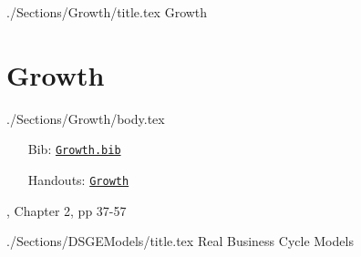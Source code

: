 \documentclass{\econtex}\newcommand{\texname}{Syllabus}
\begin{document}


\begin{verbatimwrite}{./Sections/Growth/title.tex}
Growth
\end{verbatimwrite}

\ifPost
{} 
\fi

\section{Growth}\label{sec:Growth}

\begin{verbatimwrite}{./Sections/Growth/body.tex}

\providecommand{\blf}{\cite{blanchard&fischer:text}}
\providecommand{\ro}{\cite{romer:text}}
\begin{itemize}
\item[Bib:] \texttt{\href{http://www.econ2.jhu.edu/people/ccarroll/courses/Choice/Syllabus/Growth.bib}{Growth.bib}}
\item[Handouts:]  \texttt{\href{http://www.econ2.jhu.edu/people/ccarroll/courses/choice/LectureNotes/Growth/}{Growth}}
\end{itemize}
\bi
\reqd \blf, Chapter 2, pp 37-57
\reqd \cite{deatonStateCapacity}
\reqd \cite{salaimartin:lecnotes}
\recm \cite{king&rebelo:trans}
\recm \cite{phelps:golden}
\ei

\end{verbatimwrite}



\ifPost
{} 
\fi

\begin{verbatimwrite}{./Sections/DSGEModels/title.tex}
Real Business Cycle Models
\end{verbatimwrite}
\end{document}
